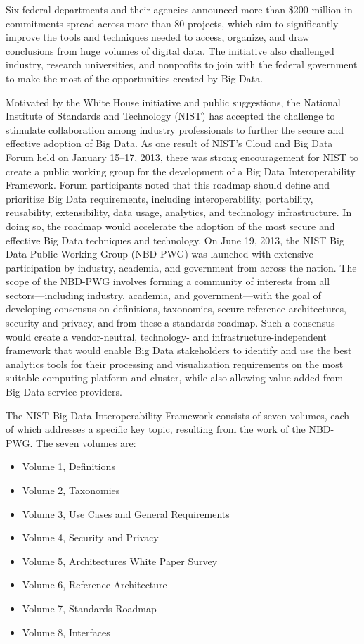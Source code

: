 \documentclass[11pt]{article}
\begin{document}
Six federal departments and their agencies announced more than \$200 million in commitments spread 
across more than 80 projects, which aim to significantly improve the tools and techniques needed to 
access, organize, and draw conclusions from huge volumes of digital data. The initiative also challenged 
industry, research universities, and nonprofits to join with the federal government to make the most of the 
opportunities created by Big Data. 

Motivated by the White House initiative and public suggestions, the National Institute of Standards and 
Technology (NIST) has accepted the challenge to stimulate collaboration among industry professionals to 
further the secure and effective adoption of Big Data. As one result of NIST’s Cloud and Big Data Forum 
held on January 15–17, 2013, there was strong encouragement for NIST to create a public working group 
for the development of a Big Data Interoperability Framework. Forum participants noted that this 
roadmap should define and prioritize Big Data requirements, including interoperability, portability, 
reusability, extensibility, data usage, analytics, and technology infrastructure. In doing so, the roadmap 
would accelerate the adoption of the most secure and effective Big Data techniques and technology.
On June 19, 2013, the NIST Big Data Public Working Group (NBD-PWG) was launched with extensive 
participation by industry, academia, and government from across the nation. The scope of the NBD-PWG 
involves forming a community of interests from all sectors—including industry, academia, and 
government—with the goal of developing consensus on definitions, taxonomies, secure reference 
architectures, security and privacy, andfrom thesea standards roadmap. Such a consensus would 
create a vendor-neutral, technology- and infrastructure-independent framework that would enable Big 
Data stakeholders to identify and use the best analytics tools for their processing and visualization 
requirements on the most suitable computing platform and cluster, while also allowing value-added from 
Big Data service providers.

The NIST Big Data Interoperability Framework consists of seven volumes, each of which addresses a 
specific key topic, resulting from the work of the NBD-PWG. The seven volumes are:

\begin{itemize}
\item	Volume 1, Definitions
\item	Volume 2, Taxonomies 
\item	Volume 3, Use Cases and General Requirements
\item	Volume 4, Security and Privacy 
\item	Volume 5, Architectures White Paper Survey
\item	Volume 6, Reference Architecture
\item	Volume 7, Standards Roadmap
\item       Volume 8, Interfaces
\end{itemize}
\end{document}
